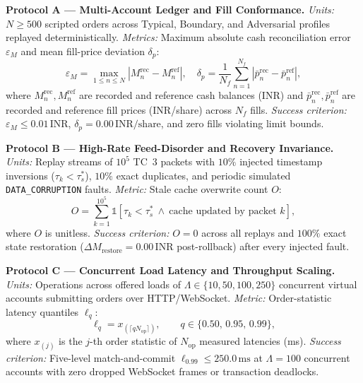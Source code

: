 \documentclass[12pt]{article}
\newcommand{\thinunit}[2]{#1\,\text{#2}}
\begin{document}
\textbf{Protocol A --- Multi-Account Ledger and Fill Conformance.} \emph{Units:} $N \ge 500$ scripted orders across Typical, Boundary, and Adversarial profiles replayed deterministically. \emph{Metrics:} Maximum absolute cash reconciliation error $\varepsilon_M$ and mean fill-price deviation $\delta_p$:
\begin{equation}
\varepsilon_M=\max_{1\le n\le N}\left|M^{\mathrm{rec}}_n-M^{\mathrm{ref}}_n\right|,\quad
\delta_p=\frac{1}{N_f}\sum_{n=1}^{N_f}\left|\bar{p}^{\mathrm{rec}}_n-\bar{p}^{\mathrm{ref}}_n\right|,
\label{eq:metricA}
\end{equation}
where $M^{\mathrm{rec}}_n, M^{\mathrm{ref}}_n$ are recorded and reference cash balances (INR) and $\bar{p}^{\mathrm{rec}}_n, \bar{p}^{\mathrm{ref}}_n$ are recorded and reference fill prices (INR/share) across $N_f$ fills. \emph{Success criterion:} $\varepsilon_M \le \thinunit{0.01}{INR}$, $\delta_p = \thinunit{0.00}{INR/share}$, and zero fills violating limit bounds.

\textbf{Protocol B --- High-Rate Feed-Disorder and Recovery Invariance.} \emph{Units:} Replay streams of $10^5$ TC~3 packets with $10\%$ injected timestamp inversions ($\tau_k < \tau^{*}_s$), $10\%$ exact duplicates, and periodic simulated \texttt{DATA\_CORRUPTION} faults. \emph{Metric:} Stale cache overwrite count $O$:
\begin{equation}
O=\sum_{k=1}^{10^5}\mathbb{1}\!\left[\tau_k<\tau^{*}_{s}\ \wedge\ \text{cache updated by packet }k\right],
\label{eq:metricB}
\end{equation}
where $O$ is unitless. \emph{Success criterion:} $O=0$ across all replays and $100\%$ exact state restoration ($\Delta M_{\mathrm{restore}}=\thinunit{0.00}{INR}$ post-rollback) after every injected fault.

\textbf{Protocol C --- Concurrent Load Latency and Throughput Scaling.} \emph{Units:} Operations across offered loads of $\Lambda \in \{10, 50, 100, 250\}$ concurrent virtual accounts submitting orders over HTTP/WebSocket. \emph{Metric:} Order-statistic latency quantiles $\ell_q$:
\begin{equation}
\ell_q = x_{(\lceil qN_{\mathrm{op}}\rceil)},\qquad q\in\{0.50,\,0.95,\,0.99\},
\label{eq:metricC}
\end{equation}
where $x_{(j)}$ is the $j$-th order statistic of $N_{\mathrm{op}}$ measured latencies (ms). \emph{Success criterion:} Five-level match-and-commit $\ell_{0.99} \le \thinunit{250.0}{ms}$ at $\Lambda=100$ concurrent accounts with zero dropped WebSocket frames or transaction deadlocks.
\end{document}
